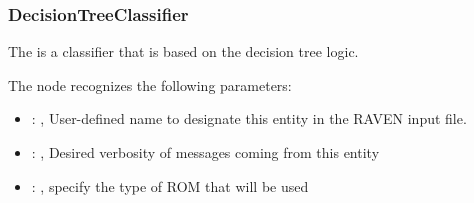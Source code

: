 \subsubsection{DecisionTreeClassifier}
  The  is a classifier that is based on the
  decision tree logic.                          

  The  node recognizes the following parameters:
    \begin{itemize}
      \item {}: , 
        User-defined name to designate this entity in the RAVEN input file.
      \item {}: , 
        Desired verbosity of messages coming from this entity
      \item {}: , 
        specify the type of ROM that will be used
  \end{itemize}


